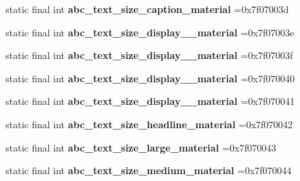 \begin{DoxyCompactItemize}
\item 
\hypertarget{classcheck_1_1test_1_1_r_1_1dimen_a9519c74dbe2514b90f539a5db539d97a}{}static final int {\bfseries abc\+\_\+text\+\_\+size\+\_\+caption\+\_\+material} =0x7f07003d\label{classcheck_1_1test_1_1_r_1_1dimen_a9519c74dbe2514b90f539a5db539d97a}

\item 
\hypertarget{classcheck_1_1test_1_1_r_1_1dimen_abceb57fe28a60581b674f401278c6824}{}static final int {\bfseries abc\+\_\+text\+\_\+size\+\_\+display\+\_\+\_\+material} =0x7f07003e\label{classcheck_1_1test_1_1_r_1_1dimen_abceb57fe28a60581b674f401278c6824}

\item 
\hypertarget{classcheck_1_1test_1_1_r_1_1dimen_adabf0cd50b030cc9c015572eea4b0484}{}static final int {\bfseries abc\+\_\+text\+\_\+size\+\_\+display\+\_\+\_\+material} =0x7f07003f\label{classcheck_1_1test_1_1_r_1_1dimen_adabf0cd50b030cc9c015572eea4b0484}

\item 
\hypertarget{classcheck_1_1test_1_1_r_1_1dimen_a8f2d311b91de86d3ec4f4778613f303b}{}static final int {\bfseries abc\+\_\+text\+\_\+size\+\_\+display\+\_\+\_\+material} =0x7f070040\label{classcheck_1_1test_1_1_r_1_1dimen_a8f2d311b91de86d3ec4f4778613f303b}

\item 
\hypertarget{classcheck_1_1test_1_1_r_1_1dimen_a6a3f21cd2a31342143896f3b1f2f28b4}{}static final int {\bfseries abc\+\_\+text\+\_\+size\+\_\+display\+\_\+\_\+material} =0x7f070041\label{classcheck_1_1test_1_1_r_1_1dimen_a6a3f21cd2a31342143896f3b1f2f28b4}

\item 
\hypertarget{classcheck_1_1test_1_1_r_1_1dimen_a1a6e1a9d67ff4c38b031f281e1012a44}{}static final int {\bfseries abc\+\_\+text\+\_\+size\+\_\+headline\+\_\+material} =0x7f070042\label{classcheck_1_1test_1_1_r_1_1dimen_a1a6e1a9d67ff4c38b031f281e1012a44}

\item 
\hypertarget{classcheck_1_1test_1_1_r_1_1dimen_a53769f85d06307a1ea269b8763c5942a}{}static final int {\bfseries abc\+\_\+text\+\_\+size\+\_\+large\+\_\+material} =0x7f070043\label{classcheck_1_1test_1_1_r_1_1dimen_a53769f85d06307a1ea269b8763c5942a}

\item 
\hypertarget{classcheck_1_1test_1_1_r_1_1dimen_aac734043fcf85da529450b347031d0ff}{}static final int {\bfseries abc\+\_\+text\+\_\+size\+\_\+medium\+\_\+material} =0x7f070044\label{classcheck_1_1test_1_1_r_1_1dimen_aac734043fcf85da529450b347031d0ff}


\end{DoxyCompactItemize}
